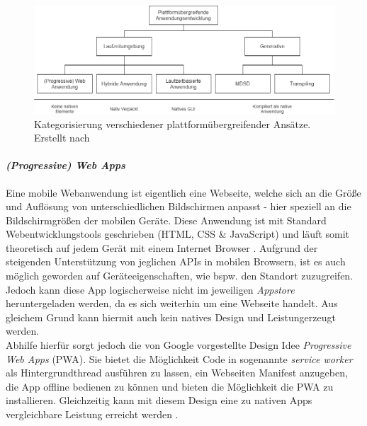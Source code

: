 \begin{figure}[tbt]
	\begin{center}
		\includegraphics[scale=0.47]{Theoretische_Grundlagen/images/crossplattform_unterteilung.png}
	\end{center}
	\caption[Kategorisierung verschiedener plattformübergreifender Ansätze]{Kategorisierung verschiedener plattformübergreifender Ansätze. Erstellt nach \cite{majchrzak2015} \protect}
	\label{fig:crossplattform_architecture}
\end{figure}

\paragraph{\textit{(Progressive) Web Apps}}
Eine mobile Webanwendung ist eigentlich eine Webseite, welche sich an die Größe und Auflösung von unterschiedlichen Bildschirmen anpasst - hier speziell an die Bildschirmgrößen der mobilen Geräte. Diese Anwendung ist mit Standard Webentwicklungstools geschrieben (HTML, CSS \& JavaScript) und läuft somit theoretisch auf jedem Gerät mit einem Internet Browser \cite{charland2011}.
Aufgrund der steigenden Unterstützung von jeglichen APIs in mobilen Browsern, ist es auch möglich geworden auf Geräteeigenschaften, wie bspw. den Standort zuzugreifen.\\
Jedoch kann diese App logischerweise nicht im jeweiligen \textit{Appstore} heruntergeladen werden, da es sich weiterhin um eine Webseite handelt.
Aus gleichem Grund kann hiermit auch kein \glqq natives Design und Leistung\grqq erzeugt werden.\\

\noindent
Abhilfe hierfür sorgt jedoch die von Google vorgestellte Design Idee \textit{Progressive Web Apps} (PWA). Sie bietet die Möglichkeit Code in sogenannte \textit{service worker} als Hintergrundthread ausführen zu lassen, ein Webseiten Manifest anzugeben, die App offline bedienen zu können und bieten die Möglichkeit die PWA zu installieren. Gleichzeitig kann mit diesem Design eine zu nativen Apps vergleichbare Leistung erreicht werden \cite{bjorn-hansen2020}. \\

